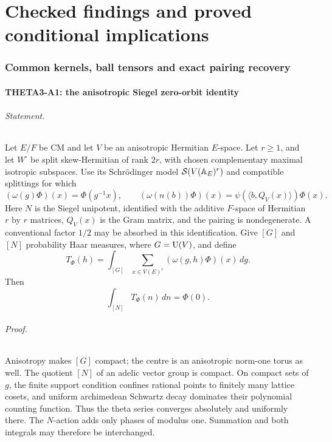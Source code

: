 \documentclass[11pt]{article}
\theoremstyle{definition}\newtheorem{definition}[theorem]{Definition}\newtheorem{remark}[theorem]{Remark}
\begin{document}
\part{Checked findings and proved conditional implications}

\section{Common kernels, ball tensors and exact pairing recovery}

\subsection{THETA3-A1: the anisotropic Siegel zero-orbit identity}\label{A1}

\paragraph{Statement.}
Let $E/F$ be CM and let $V$ be an anisotropic Hermitian $E$-space.
Let $r\geq1$, and let $W^{\square}$ be split skew-Hermitian of rank
$2r$, with chosen complementary maximal isotropic subspaces. Use its
Schr\"odinger model $\mathcal S(V(\mathbb A_E)^r)$ and compatible splittings
for which
\[
 (\omega(g)\Phi)(x)=\Phi(g^{-1}x),\qquad
 (\omega(n(b))\Phi)(x)=\psi(\langle b,Q_V(x)\rangle)\Phi(x).
\]
Here $N$ is the Siegel unipotent, identified with the additive
$F$-space of Hermitian $r$ by $r$ matrices, $Q_V(x)$ is the Gram
matrix, and the pairing is nondegenerate. A conventional factor
$1/2$ may be absorbed in this identification. Give $[G]$ and $[N]$
probability Haar measures, where $G=\operatorname{U}(V)$, and define
\[
 T_\Phi(h)=\int_{[G]}\sum_{x\in V(E)^r}(\omega(g,h)\Phi)(x)\,dg.
\]
Then
\begin{equation}\label{A1-eq}
                    \int_{[N]}T_\Phi(n)\,dn=\Phi(0).
\end{equation}

\paragraph{Proof.}
Anisotropy makes $[G]$ compact; the centre is an anisotropic norm-one
torus as well. The quotient $[N]$ of an adelic vector group is compact.
On compact sets of $g$, the finite support condition confines rational
points to finitely many lattice cosets, and uniform archimedean
Schwartz decay dominates their polynomial counting function. Thus the
theta series converges absolutely and uniformly there. The $N$-action
adds only phases of modulus one. Summation and both integrals may
therefore be interchanged.
\end{document}
